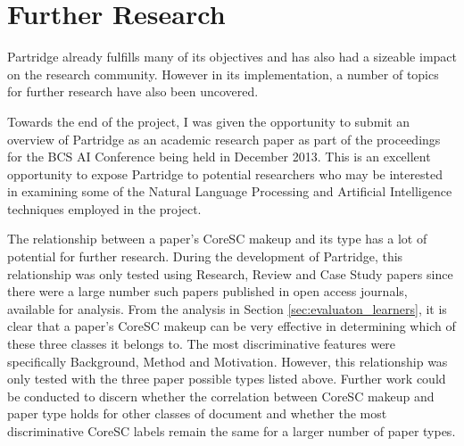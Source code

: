 \section{ Further Research }

Partridge already fulfills many of its objectives and has also had a sizeable
impact on the research community. However in its implementation, a number of
topics for further research have also been uncovered.

Towards the end of the project, I was given the opportunity to submit an
overview of Partridge as an academic research paper as part of the proceedings
for the BCS AI Conference being held in December 2013. This is an excellent
opportunity to expose Partridge to potential researchers who may be interested
in examining some of the Natural Language Processing and Artificial
Intelligence techniques employed in the project.

The relationship between a paper's  CoreSC makeup and its type has a lot of
potential for further research. During the development of Partridge, this
relationship was only tested using Research, Review and Case Study papers since
there were a large number such papers published in open access journals,
available for analysis. From the analysis in Section
\ref{sec:evaluaton_learners}, it is clear that a paper's CoreSC makeup can be
very effective in determining which of these three classes it belongs to. The
most discriminative features were specifically Background, Method and
Motivation. However, this relationship was only tested with the three paper
possible types listed above. Further work could be conducted to discern whether
the correlation between CoreSC makeup and paper type holds for other classes of
document and whether the most discriminative CoreSC labels remain the same for
a larger number of paper types.
